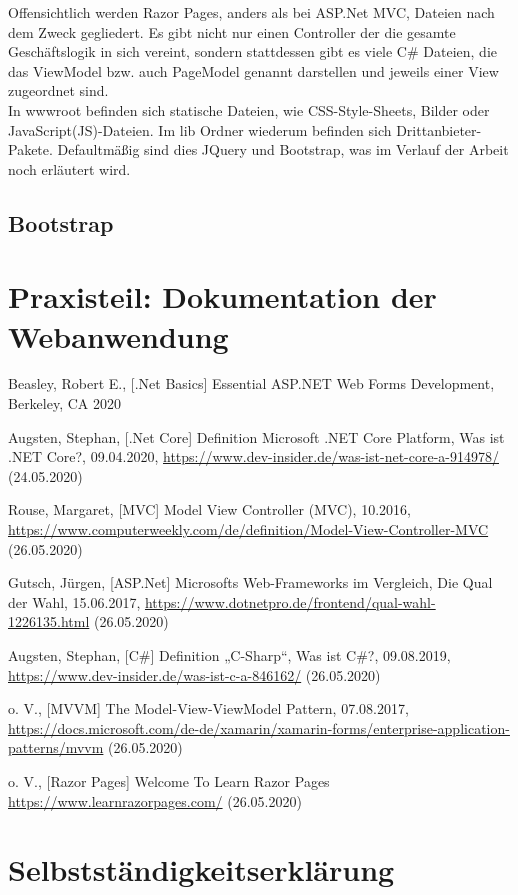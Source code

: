 \documentclass[a4paper,
12pt,
oneside]
{article}
\begin{document}
	Offensichtlich werden Razor Pages, anders als bei ASP.Net MVC, Dateien nach dem Zweck gegliedert. Es gibt nicht nur einen Controller der die gesamte Geschäftslogik in sich vereint, sondern stattdessen gibt es viele C\# Dateien, die das ViewModel bzw. auch PageModel genannt darstellen und jeweils einer View zugeordnet sind. \\
	In wwwroot befinden sich statische Dateien, wie CSS-Style-Sheets, Bilder oder JavaScript(JS)-Dateien. Im lib Ordner wiederum befinden sich Drittanbieter-Pakete. Defaultmäßig sind dies JQuery und Bootstrap, was im Verlauf der Arbeit noch erläutert wird.
		
	\subsection{Bootstrap}
	\clearpage
	
	
	
	\section{Praxisteil: Dokumentation der Webanwendung}
	\clearpage
	
	
	
	\thispagestyle{empty}
	\nocite{*}
	\begin{thebibliography}{}
		 Beasley, Robert E., [.Net Basics] Essential ASP.NET Web Forms Development, Berkeley, CA 2020 
		
		 Augsten, Stephan, [.Net Core] Definition \glqq Microsoft .NET Core Platform\grqq, Was ist .NET Core?, 09.04.2020, \url{https://www.dev-insider.de/was-ist-net-core-a-914978/} (24.05.2020)
		
		 Rouse, Margaret, [MVC] Model View Controller (MVC), 10.2016, \url{https://www.computerweekly.com/de/definition/Model-View-Controller-MVC} (26.05.2020)
		
		 Gutsch, Jürgen, [ASP.Net] Microsofts Web-Frameworks im Vergleich, Die Qual der Wahl, 15.06.2017, \url{https://www.dotnetpro.de/frontend/qual-wahl-1226135.html} (26.05.2020)
		
		 Augsten, Stephan, [C\#] Definition „C-Sharp“, Was ist C\#?, 09.08.2019, \url{https://www.dev-insider.de/was-ist-c-a-846162/} (26.05.2020)
		
		 o. V., [MVVM] The Model-View-ViewModel Pattern, 07.08.2017, \url{https://docs.microsoft.com/de-de/xamarin/xamarin-forms/enterprise-application-patterns/mvvm} (26.05.2020)
		
		 o. V., [Razor Pages] Welcome To Learn Razor Pages \url{https://www.learnrazorpages.com/} (26.05.2020)
	\end{thebibliography}
	\clearpage
	
	
	\section*{Selbstständigkeitserklärung}
	
\end{document}
